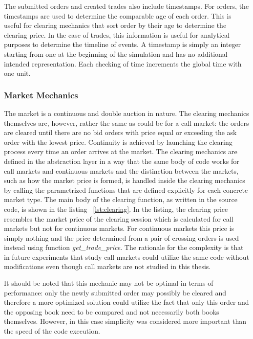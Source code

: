 The submitted orders and created trades also include timestamps. For orders, the timestamps are used
to determine the comparable age of each order. This is useful for clearing mechanics that sort 
order by their age to determine the clearing price. In the case of trades, this information
is useful for analytical purposes to determine the timeline of events. A timestamp is simply 
an integer starting from one at the beginning of the simulation and has no additional 
intended representation. Each checking of time increments the global time with one unit.

\subsubsection{Market Mechanics}

The market is a continuous and double auction in nature.
The clearing mechanics themselves are, however, 
rather the same as could be for a call market: 
the orders are cleared until there
are no bid orders with price equal or exceeding the
ask order with the lowest price. 
Continuity is achieved by launching the clearing process
every time an order arrives at the market. 
The clearing mechanics are defined in 
the abstraction layer in a way that the same body
of code works for call markets and continuous markets
and the distinction between the markets, such as how 
the market price is formed, is handled inside the clearing
mechanics by calling the parametrized functions that are 
defined explicitly for each concrete market type. 
The main body of the clearing function, 
as written in the source code, is shown in the listing ~\ref{lst:clearing}.
In the listing, the clearing price resembles the market price
of the clearing session which is calculated for call markets but not for 
continuous markets. For continuous markets this price is simply nothing and
the price determined from a pair of crossing orders is used instead using function
\emph{get\_trade\_price}. The rationale for the complexity is that in future experiments
that study call markets could utilize the same code without modifications 
even though call markets are not studied in this thesis.

It should be noted that this mechanic may not be optimal in terms of performance: 
only the newly submitted order may possibly be cleared and therefore a more 
optimized solution could utilize the fact that only this order and the opposing book 
need to be compared and not necessarily both books themselves. However, 
in this case simplicity was considered more important than the speed of the code execution.


